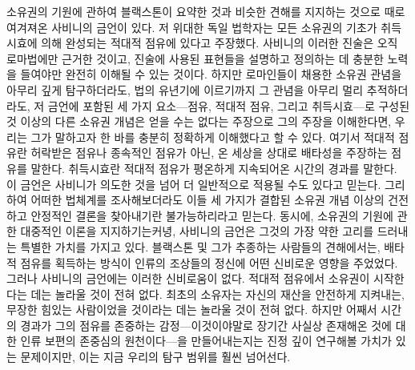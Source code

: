 소유권의 기원에 관하여
블랙스톤이 요약한 것과 비슷한 견해를 지지하는 것으로
때로 여겨져온 사비니의 금언이 있다.
저 위대한 독일 법학자는
모든 소유권의 기초가
취득시효에 의해 완성되는
적대적 점유에 있다고 주장했다.
사비니의 이러한 진술은 오직 로마법에만 근거한 것이고,
진술에 사용된 표현들을 설명하고 정의하는 데 충분한 노력을 들여야만
완전히 이해될 수 있는 것이다.
하지만
로마인들이 채용한 소유권 관념을 아무리 깊게 탐구하더라도,
법의 유년기에 이르기까지 그 관념을 아무리 멀리 추적하더라도,
저 금언에 포함된 세 가지 요소---점유, 적대적 점유, 그리고 취득시효---로
구성된 것 이상의
다른 소유권 개념은
얻을 수는 없다는 주장으로
그의 주장을
이해한다면,
우리는 그가 말하고자 한 바를 충분히 정확하게 이해했다고 할 수 있다.
여기서
적대적 점유란 허락받은 점유나 종속적인 점유가 아닌,
온 세상을 상대로 배타성을 주장하는 점유를 말한다.
취득시효란 적대적 점유가 평온하게 지속되어온 시간의 경과를 말한다.
이 금언은 사비니가 의도한 것을 넘어 더 일반적으로 적용될 수도 있다고 믿는다.
그리하여 어떠한 법체계를 조사해보더라도
이들 세 가지가 결합된 소유권 개념 이상의
건전하고 안정적인 결론을 찾아내기란 불가능하리라고 믿는다.
동시에,
소유권의 기원에 관한 대중적인 이론을 지지하기는커녕,
사비니의 금언은 그것의 가장 약한 고리를 드러내는 특별한 가치를 가지고 있다.
블랙스톤 및 그가 추종하는 사람들의 견해에서는,
배타적 점유를 획득하는 방식이
인류의 조상들의 정신에 어떤 신비로운 영향을 주었었다.
그러나 사비니의 금언에는 이러한 신비로움이 없다.
적대적 점유에서 소유권이 시작한다는 데는 놀라울 것이 전혀 없다.
최초의 소유자는 자신의 재산을 안전하게 지켜내는,
무장한 힘있는 사람이었을
것이라는 데는 놀라울 것이 전혀 없다.
하지만 어째서 시간의 경과가 그의 점유를 존중하는 감정---이것이야말로
장기간 사실상 존재해온 것에 대한 인류 보편의 존중심의
원천이다---을 만들어내는지는
진정 깊이 연구해볼 가치가 있는 문제이지만,
이는 지금 우리의 탐구 범위를 훨씬 넘어선다.

